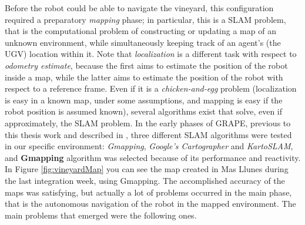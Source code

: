 Before the robot could be able to navigate the vineyard, this configuration required a preparatory \textit{mapping} phase; in particular, this is a \ac{SLAM} problem, that is the computational problem of constructing or updating a map of an unknown environment, while simultaneously keeping track of an agent's (the \ac{UGV}) location within it. Note that \textit{localization} is a different task with respect to \textit{odometry estimate}, because the first aims to estimate the position of the robot inside a map, while the latter aims to estimate the position of the robot with respect to a reference frame. Even if it is a \textit{chicken-and-egg} problem (localization is easy in a known map, under some assumptions, and  mapping is easy if the robot position is assumed known), several algorithms exist that solve, even if approximately, the \ac{SLAM} problem. In the early phases of \ac{GRAPE}, previous to this thesis work and described in \cite{grapeAltroPaper}, three different \ac{SLAM} algorithms were tested in our specific environment: \textit{Gmapping}, \textit{Google's Cartographer} and \textit{KartoSLAM}, and \textbf{Gmapping} algorithm was selected because of its performance and reactivity. In Figure \ref{fig:vineyardMap} you can see the map created in Mas Llunes during the last integration week, using Gmapping. The accomplished accuracy of the maps was satisfying, but actually a lot of problems occurred in the main phase, that is the autonomous navigation of the robot in the mapped environment. The main problems that emerged were the following ones. 

